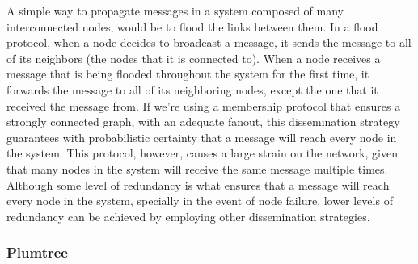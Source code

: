 \documentclass[sigconf]{acmart}
\begin{document}
A simple way to propagate messages in a system composed of many interconnected nodes, would be to flood the links between them. In a flood protocol, when a node decides to broadcast a message, it sends the message to all of its neighbors (the nodes that it is connected to). When a node receives a message that is being flooded throughout the system for the first time, it forwards the message to all of its neighboring nodes, except the one that it received the message from.
If we're using a membership protocol that ensures a strongly connected graph, with an adequate fanout, this dissemination strategy guarantees with probabilistic certainty that a message will reach every node in the system. 
This protocol, however, causes a large strain on the network, given that many nodes in the system will receive the same message multiple times. Although some level of redundancy is what ensures that a message will reach every node in the system, specially in the event of node failure, lower levels of redundancy can be achieved by employing other dissemination strategies.

\subsubsection{Plumtree}
\end{document}
